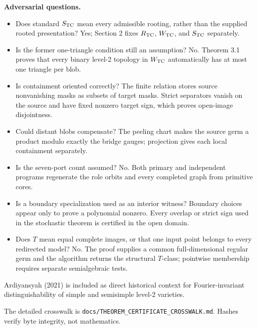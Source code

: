 \documentclass[10pt]{article}
\begin{document}
\textbf{Adversarial questions.}
\begin{itemize}
\item Does standard $S_{\rm TC}$ mean every admissible rooting, rather than the supplied rooted presentation?  Yes; Section 2 fixes $R_{\rm TC}$, $W_{\rm TC}$, and $S_{\rm TC}$ separately.
\item Is the former one-triangle condition still an assumption?  No.  Theorem 3.1 proves that every binary level-2 topology in $W_{\rm TC}$ automatically has at most one triangle per blob.
\item Is containment oriented correctly?  The finite relation stores source nonvanishing masks as subsets of target masks.  Strict separators vanish on the source and have fixed nonzero target sign, which proves open-image disjointness.
\item Could distant blobs compensate?  The peeling chart makes the source germ a product modulo exactly the bridge gauges; projection gives each local containment separately.
\item Is the seven-port count assumed?  No.  Both primary and independent programs regenerate the role orbits and every completed graph from primitive cores.
\item Is a boundary specialization used as an interior witness?  Boundary choices appear only to prove a polynomial nonzero.  Every overlap or strict sign used in the stochastic theorem is certified in the open domain.
\item Does $T$ mean equal complete images, or that one input point belongs to every redirected model?  No.  The proof supplies a common full-dimensional regular germ and the algorithm returns the structural $T$-class; pointwise membership requires separate semialgebraic tests.
\end{itemize}

Ardiyansyah (2021) is included as direct historical context for Fourier-invariant distinguishability of simple and semisimple level-2 varieties.\par\medskip

The detailed crosswalk is \texttt{docs/THEOREM\_CERTIFICATE\_CROSSWALK.md}.  Hashes verify byte integrity, not mathematics.
\end{document}
